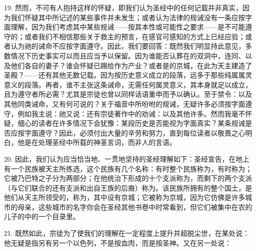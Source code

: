 19. 然而，不可有人抱持这样的怀疑，即我们认为圣经中的任何记载并非真实，因为我们怀疑其中所记述的某些事件并未发生；或者认为法律的规诫没有一条应按字面理解，因为我们考虑其中某些规诫——按其本性或可能性之要求——是不可能遵守的；或者我们不相信那些关于救主的预言，在感官可感知的方式上已经应验；或者认为祂的诫命不应按字面遵守。因此，我们要回答：既然我们明显持此意见，多数情况下历史事实可以而且应当予以保留。因为谁能否认葬在的双洞中，连同、以及他们各自的妻子？谁会怀疑已赐给作为产业？或者是的京城，在此为天主建造了圣殿？——还有其他无数记载。因为按历史意义成立的段落，远多于那些纯属属灵意义的段落。再者，谁不主张这条诫命，无需任何属灵意义，其本身就足以成立，且为遵守者所必需？尤其是宗徒也曾以同样话语重申而予以确认。至于禁令：以及其他同类诫命，又有何可说的？关于福音中所吩咐的规诫，无疑许多必须按字面遵守，例如我主说：祂又说：还有宗徒著作中的劝诫：以及其他许多。然而我毫不怀疑，细心的读者在许多情况下会犹豫：某段历史是否能视为字面真实？某条规诫是否应按字面遵守？因此，必须付出大量的辛劳和努力，直到每位读者以敬畏之心明白，他是在处理圣经中所载的神圣言词，而非人的言语。\par

20. 因此，我们认为应当恰当地、一贯地坚持的圣经理解如下：圣经宣告，在地上有一个民族被天主所拣选，这个民族有几个名称：有时整个民族称为，有时称为；它被乃巴特之子分为两部分；在他统治下形成的十个支派称为，而剩下的两个支派（与它们联合的还有支派和出自王族的后裔）称为。该民族所拥有的整个国土，是他们从天主所领受的，称为，其中设有京城；它被称为京城，因为它仿佛是许多城市的母亲，这些城市的名字你会在圣经其他书卷中时常看到，但它们被集中在农的儿子的中的一个目录里。\par

21. 既然如此，宗徒为了使我们的理解在一定程度上提升并超脱尘世，在某处说：他无疑是指另有另一个以色列，不是按血肉，而是按圣神。又在另一处说：\par

